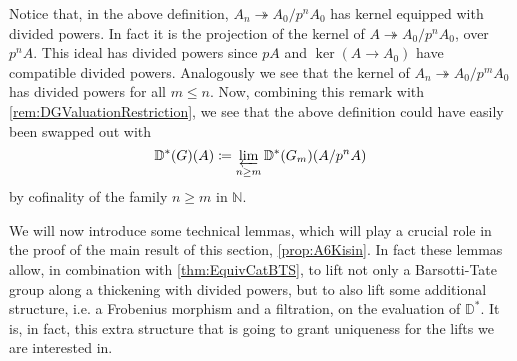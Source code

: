 \begin{rem}[]
	Notice that, in the above definition, $A_n \twoheadrightarrow A_0/p^nA_0$
	has kernel equipped with divided powers.
	In fact it is the projection of the kernel of $A \twoheadrightarrow A_0/p^nA_0$, over
	$p^nA$.
	This ideal has divided powers since $pA$ and $\ker (A \to A_0)$ have compatible
	divided powers.
	Analogously we see that the kernel of $A_n \twoheadrightarrow A_0/p^mA_0$
	has divided powers for all $m \leq n$.
	Now, combining this remark with \cref{rem:DGValuationRestriction},
	we see that the above definition could have easily been swapped out with
	\begin{equation*}
		\mathbb{D}^*(G)(A) \coloneqq
		\varprojlim_{n \geq m} \mathbb{D}^*(G_m)(A/p^nA)
	\end{equation*}
	by cofinality of the family $n \geq m$ in $\mathbb{N}$.
\end{rem}


\begin{rem}[]
	We will now introduce some technical lemmas, which will play a crucial role
	in the proof of the main result of this section, \cref{prop:A6Kisin}.
	In fact these lemmas allow, in combination with \cref{thm:EquivCatBTS},
	to lift not only a Barsotti-Tate group along a thickening with divided
	powers, but to also lift some additional structure, i.e.
	a Frobenius morphism and a filtration, on the evaluation of $\mathbb{D}^*$.
	It is, in fact, this extra structure that is going to grant
	uniqueness for the lifts we are interested in.
\end{rem}


